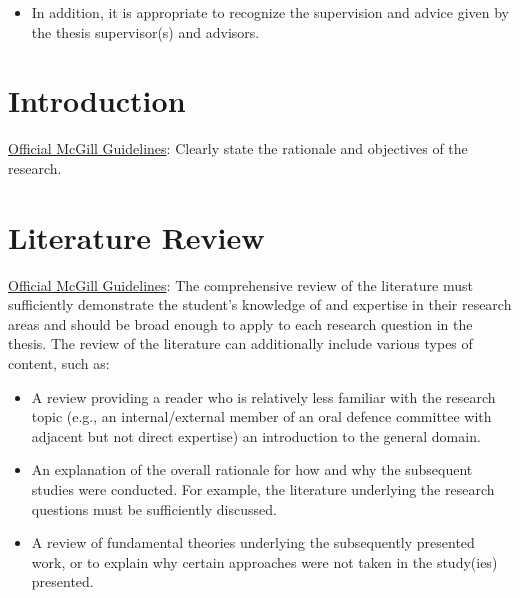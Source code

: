 \documentclass[
  letterpaper,
  12pt,
  oneside]{book}
\providecommand{\tightlist}{%
  \setlength{\itemsep}{0pt}\setlength{\parskip}{0pt}}
\begin{document}
\begin{itemize}
\tightlist
\item
  In addition, it is appropriate to recognize the supervision and advice
  given by the thesis supervisor(s) and advisors.
\end{itemize}

\tableofcontents
\listoffigures
\listoftables
\clearpage
\mainmatter


\chapter{Introduction}\label{introduction}

\href{https://www.mcgill.ca/gps/thesis/thesis-guidelines/preparation}{Official
McGill Guidelines}: Clearly state the rationale and objectives of the
research.


\chapter{Literature Review}\label{literature-review}

\href{https://www.mcgill.ca/gps/thesis/thesis-guidelines/preparation}{Official
McGill Guidelines}: The comprehensive review of the literature must
sufficiently demonstrate the student's knowledge of and expertise in
their research areas and should be broad enough to apply to each
research question in the thesis. The review of the literature can
additionally include various types of content, such as:

\begin{itemize}
\tightlist
\item
  A review providing a reader who is relatively less familiar with the
  research topic (e.g., an internal/external member of an oral defence
  committee with adjacent but not direct expertise) an introduction to
  the general domain.
\item
  An explanation of the overall rationale for how and why the subsequent
  studies were conducted. For example, the literature underlying the
  research questions must be sufficiently discussed.
\item
  A review of fundamental theories underlying the subsequently presented
  work, or to explain why certain approaches were not taken in the
  study(ies) presented.
\end{itemize}
\end{document}
